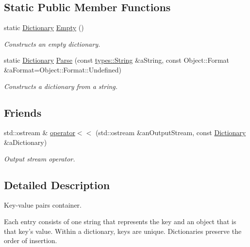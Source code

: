 \subsection*{Static Public Member Functions}
\begin{DoxyCompactItemize}
\item 
static \hyperlink{classlibrary_1_1core_1_1ctnr_1_1_dictionary}{Dictionary} \hyperlink{classlibrary_1_1core_1_1ctnr_1_1_dictionary_a236f8efd7a01e7a91061e8ed933112b7}{Empty} ()
\begin{DoxyCompactList}\small\item\em Constructs an empty dictionary. \end{DoxyCompactList}\item 
static \hyperlink{classlibrary_1_1core_1_1ctnr_1_1_dictionary}{Dictionary} \hyperlink{classlibrary_1_1core_1_1ctnr_1_1_dictionary_a311b8632d8e48baf9effd102ad4da85a}{Parse} (const \hyperlink{classlibrary_1_1core_1_1types_1_1_string}{types\+::\+String} \&a\+String, const Object\+::\+Format \&a\+Format=Object\+::\+Format\+::\+Undefined)
\begin{DoxyCompactList}\small\item\em Constructs a dictionary from a string. \end{DoxyCompactList}\end{DoxyCompactItemize}
\subsection*{Friends}
\begin{DoxyCompactItemize}
\item 
std\+::ostream \& \hyperlink{classlibrary_1_1core_1_1ctnr_1_1_dictionary_a95fa6b67a0c39d2d7069ad71a53910ec}{operator$<$$<$} (std\+::ostream \&an\+Output\+Stream, const \hyperlink{classlibrary_1_1core_1_1ctnr_1_1_dictionary}{Dictionary} \&a\+Dictionary)
\begin{DoxyCompactList}\small\item\em Output stream operator. \end{DoxyCompactList}\end{DoxyCompactItemize}


\subsection{Detailed Description}
Key-\/value pairs container. 

Each entry consists of one string that represents the key and an object that is that key’s value. Within a dictionary, keys are unique. Dictionaries preserve the order of insertion. 

